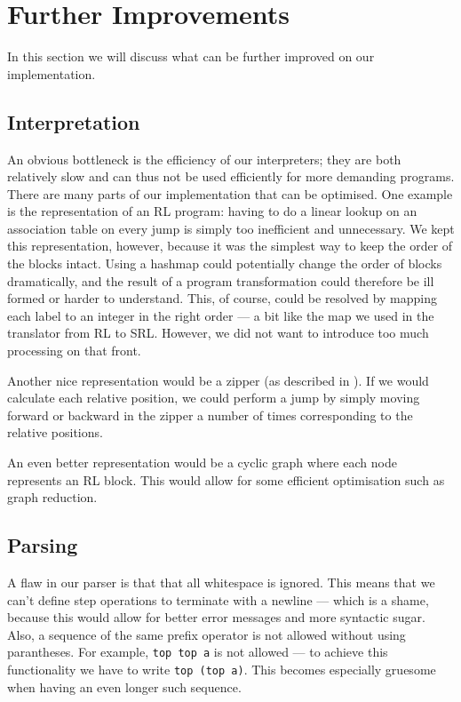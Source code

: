 \section{Further Improvements}
In this section we will discuss what can be further improved on our implementation.

\subsection{Interpretation}
An obvious bottleneck is the efficiency of our interpreters; they are both relatively slow and can thus not be used efficiently for more demanding programs. There are many parts of our implementation that can be optimised. One example is the representation of an RL program: having to do a linear lookup on an association table on every jump is simply too inefficient and unnecessary. We kept this representation, however, because it was the simplest way to keep the order of the blocks intact. Using a hashmap could potentially change the order of blocks dramatically, and the result of a program transformation could therefore be ill formed or harder to understand. This, of course, could be resolved by mapping each label to an integer in the right order --- a bit like the map we used in the translator from RL to SRL. However, we did not want to introduce too much processing on that front.

Another nice representation would be a zipper (as described in \cite{ZIP}). If we would calculate each relative position, we could perform a jump by simply moving forward or backward in the zipper a number of times corresponding to the relative positions.

An even better representation would be a cyclic graph where each node represents an RL block. This would allow for some efficient optimisation such as graph reduction.


\subsection{Parsing}
A flaw in our parser is that that all whitespace is ignored. This means that we can't define step operations to terminate with a newline --- which is a shame, because this would allow for better error messages and more syntactic sugar. Also, a sequence of the same prefix operator is not allowed without using parantheses. For example, \texttt{top top a} is not allowed --- to achieve this functionality we have to write \texttt{top (top a)}. This becomes especially gruesome when having an even longer such sequence.

